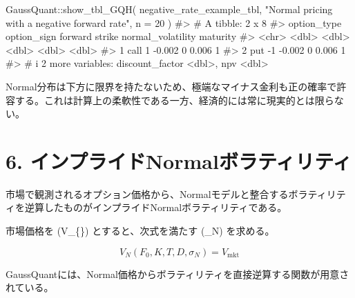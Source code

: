 \documentclass[
  letterpaper,
  DIV=11,
  numbers=noendperiod]{scrreprt}
\newenvironment{Shaded}{\begin{snugshade}}{\end{snugshade}}
\newcommand{\AttributeTok}[1]{\textcolor[rgb]{0.40,0.45,0.13}{#1}}
\newcommand{\CommentTok}[1]{\textcolor[rgb]{0.37,0.37,0.37}{#1}}
\newcommand{\DecValTok}[1]{\textcolor[rgb]{0.68,0.00,0.00}{#1}}
\newcommand{\FunctionTok}[1]{\textcolor[rgb]{0.28,0.35,0.67}{#1}}
\newcommand{\NormalTok}[1]{\textcolor[rgb]{0.00,0.23,0.31}{#1}}
\newcommand{\SpecialCharTok}[1]{\textcolor[rgb]{0.37,0.37,0.37}{#1}}
\newcommand{\StringTok}[1]{\textcolor[rgb]{0.13,0.47,0.30}{#1}}
\begin{document}
\begin{Shaded}
\begin{Highlighting}[]
\NormalTok{GaussQuant}\SpecialCharTok{::}\FunctionTok{show\_tbl\_GQH}\NormalTok{(}
\NormalTok{  negative\_rate\_example\_tbl,}
  \StringTok{"Normal pricing with a negative forward rate"}\NormalTok{,}
  \AttributeTok{n =} \DecValTok{20}
\NormalTok{)}
\CommentTok{\#\textgreater{} \# A tibble: 2 x 8}
\CommentTok{\#\textgreater{}   option\_type option\_sign forward strike normal\_volatility maturity}
\CommentTok{\#\textgreater{}   \textless{}chr\textgreater{}             \textless{}dbl\textgreater{}   \textless{}dbl\textgreater{}  \textless{}dbl\textgreater{}             \textless{}dbl\textgreater{}    \textless{}dbl\textgreater{}}
\CommentTok{\#\textgreater{} 1 call                  1  {-}0.002      0             0.006        1}
\CommentTok{\#\textgreater{} 2 put                  {-}1  {-}0.002      0             0.006        1}
\CommentTok{\#\textgreater{} \# i 2 more variables: discount\_factor \textless{}dbl\textgreater{}, npv \textless{}dbl\textgreater{}}
\end{Highlighting}
\end{Shaded}

Normal分布は下方に限界を持たないため、極端なマイナス金利も正の確率で許容する。これは計算上の柔軟性である一方、経済的には常に現実的とは限らない。

\section{6.
インプライドNormalボラティリティ}\label{ux30a4ux30f3ux30d7ux30e9ux30a4ux30c9normalux30dcux30e9ux30c6ux30a3ux30eaux30c6ux30a3}

市場で観測されるオプション価格から、Normalモデルと整合するボラティリティを逆算したものがインプライドNormalボラティリティである。

市場価格を (V\_\{\}) とすると、次式を満たす (\sigma\_N)
を求める。

\[
V_N(
F_0,
K,
T,
D,
\sigma_N
)
=
V_{\mathrm{mkt}}
\]

GaussQuantには、Normal価格からボラティリティを直接逆算する関数が用意されている。
\end{document}

